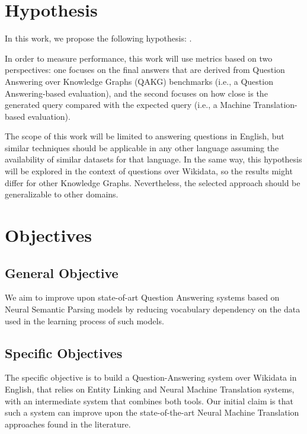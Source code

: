 \section{Hypothesis}
In this work, we propose the following hypothesis: .

In order to measure performance, this work will use metrics based on two perspectives: 
one focuses on the final answers that are derived from Question Answering over Knowledge 
Graphs (QAKG) benchmarks (i.e., a Question Answering-based evaluation), and the second 
focuses on how close is the generated \SPARQL{} query compared with the expected query (i.e., 
a Machine Translation-based evaluation).

The scope of this work will be limited to answering questions in English, but similar 
techniques should be applicable in any other language assuming the availability of similar 
datasets for that language. In the same way, this hypothesis will be explored in the context of 
questions over Wikidata, so the results might differ for other Knowledge Graphs. Nevertheless, 
the selected approach should be generalizable to other domains. 

\section{Objectives}
\subsection*{General Objective}
We aim to improve upon state-of-art Question Answering systems 
based on Neural Semantic Parsing models by reducing vocabulary dependency on the 
data used in the learning process of such models.
\subsection*{Specific Objectives}
The specific objective is to build a Question-Answering system over Wikidata in English, 
that relies on Entity Linking and Neural Machine Translation systems, with an intermediate 
system that combines both tools. Our initial claim is that such a system can improve upon 
the state-of-the-art Neural Machine Translation approaches found in the literature.  

